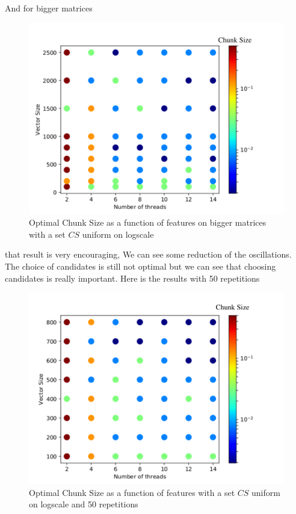 And for bigger matrices
\begin{figure}[H]
	\centering
	\includegraphics[width=120mm]{images/chunk_size_function_matrix_uniform_log_big.pdf}
	\caption{Optimal Chunk Size as a function of features on bigger matrices with a set $CS$ uniform on logscale }
\end{figure}

that result is very encouraging, We can see some reduction of the oscillations. The choice of candidates is still not optimal but we can see that choosing candidates is really important. Here is the results with 50 repetitions

\begin{figure}[H]
	\centering
	\includegraphics[width=120mm]{images/chunk_size_function_matrix_uniform_log_50rep.pdf}
	\caption{Optimal Chunk Size as a function of features with a set $CS$ uniform on logscale and 50 repetitions}
\end{figure}

